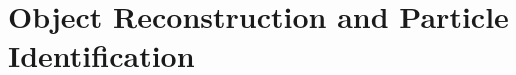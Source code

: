 





\section{Object Reconstruction and Particle Identification} \label{sec:Jets:Reconstruction}



